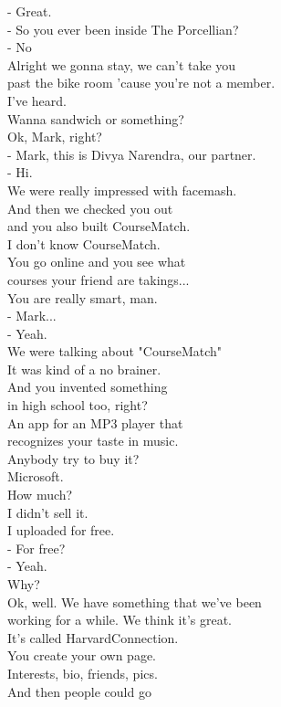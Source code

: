\documentclass{article}
\begin{document}
\begin{multicols}{3}
- Great.\\
- So you ever been inside The Porcellian?\\
- No\\
Alright we gonna stay, we can't take you\\
past the bike room 'cause you're not a member.\\
I've heard.\\
Wanna sandwich or something?\\
Ok, Mark, right?\\
- Mark, this is Divya Narendra, our partner.\\
- Hi.\\
We were really impressed with facemash.\\
And then we checked you out\\
and you also built CourseMatch.\\
I don't know CourseMatch.\\
You go online and you see what\\
courses your friend are takings...\\
You are really smart, man.\\
- Mark...\\
- Yeah.\\
We were talking about "CourseMatch"\\
It was kind of a no brainer.\\
And you invented something\\
in high school too, right?\\
An app for an MP3 player that\\
recognizes your taste in music.\\
Anybody try to buy it?\\
Microsoft.\\
How much?\\
I didn't sell it.\\
I uploaded for free.\\
- For free?\\
- Yeah.\\
Why?\\
Ok, well. We have something that we've been\\
working for a while. We think it's great.\\
It's called HarvardConnection.\\
You create your own page.\\
Interests, bio, friends, pics.\\
And then people could go\\

\end{multicols}
\end{document}
